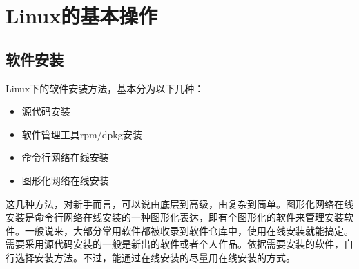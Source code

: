 \chapter{Linux的基本操作}
\section{软件安装}
Linux下的软件安装方法，基本分为以下几种：
\begin{itemize}
\item 源代码安装
\item 软件管理工具rpm/dpkg安装
\item 命令行网络在线安装
\item 图形化网络在线安装
\end{itemize}

这几种方法，对新手而言，可以说由底层到高级，由复杂到简单。图形化网络在线安装是命令行网络在线安装的一种图形化表达，即有个图形化的软件来管理安装软件。一般说来，大部分常用软件都被收录到软件仓库中，使用在线安装就能搞定。需要采用源代码安装的一般是新出的软件或者个人作品。依据需要安装的软件，自行选择安装方法。不过，能通过在线安装的尽量用在线安装的方式。




